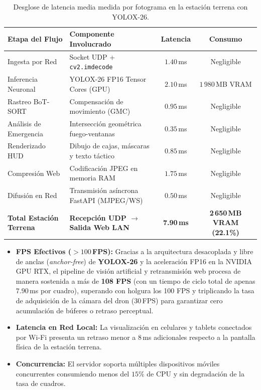 \documentclass[11pt,a4paper]{article}
\begin{document}
\begin{table}[H]
\centering
\small
\begin{tabularx}{\textwidth}{l>{\raggedright\arraybackslash}Xcc}
\toprule
\textbf{Etapa del Flujo} & \textbf{Componente Involucrado} & \textbf{Latencia} & \textbf{Consumo} \\
\midrule
Ingesta por Red & Socket UDP + \texttt{cv2.imdecode} & $1.40$\,ms & Negligible \\
Inferencia Neuronal & YOLOX-26 FP16 Tensor Cores (GPU) & $2.10$\,ms & $1\,980$\,MB VRAM \\
Rastreo BoT-SORT & Compensación de movimiento (GMC) & $0.95$\,ms & Negligible \\
Análisis de Emergencia & Intersección geométrica fuego-ventanas & $0.35$\,ms & Negligible \\
Renderizado HUD & Dibujo de cajas, máscaras y texto táctico & $0.85$\,ms & Negligible \\
Compresión Web & Codificación JPEG en memoria RAM & $1.75$\,ms & Negligible \\
Difusión en Red & Transmisión asíncrona FastAPI (MJPEG/WS) & $0.50$\,ms & Negligible \\
\midrule
\textbf{Total Estación Terrena} & \textbf{Recepción UDP $\to$ Salida Web LAN} & \textbf{7.90\,ms} & \textbf{2\,650\,MB VRAM (22.1\%)} \\
\bottomrule
\end{tabularx}
\caption{Desglose de latencia media medida por fotograma en la estación terrena con YOLOX-26.}
\label{tab:latencias_anexo}
\end{table}

\begin{itemize}
    \item \textbf{FPS Efectivos ($>100$\,FPS):} Gracias a la arquitectura desacoplada y libre de anclas (\textit{anchor-free}) de \textbf{YOLOX-26} y la aceleración FP16 en la NVIDIA GPU RTX, el pipeline de visión artificial y retransmisión web procesa de manera sostenida a más de \textbf{108 FPS} (con un tiempo de ciclo total de apenas $7.90$\,ms por cuadro), superando con holgura los 100 FPS y triplicando la tasa de adquisición de la cámara del dron ($30$\,FPS) para garantizar cero acumulación de búferes o retraso perceptual.
    \item \textbf{Latencia en Red Local:} La visualización en celulares y tablets conectados por Wi-Fi presenta un retraso menor a $8$\,ms adicionales respecto a la pantalla física de la estación terrena.
    \item \textbf{Concurrencia:} El servidor soporta múltiples dispositivos móviles concurrentes consumiendo menos del $15\%$ de CPU y sin degradación de la tasa de cuadros.
\end{itemize}
\end{document}

